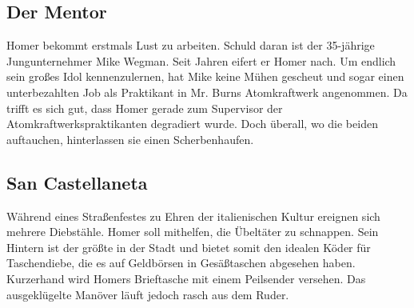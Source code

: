 \subsection{Der Mentor}
Homer bekommt erstmals Lust zu arbeiten. Schuld daran ist der 35-jährige Jungunternehmer Mike Wegman. Seit Jahren eifert er Homer nach. Um endlich sein großes Idol kennenzulernen, hat Mike keine Mühen gescheut und sogar einen unterbezahlten Job als Praktikant in Mr. Burns Atomkraftwerk angenommen. Da trifft es sich gut, dass Homer gerade zum Supervisor der Atomkraftwerkspraktikanten degradiert wurde. Doch überall, wo die beiden auftauchen, hinterlassen sie einen Scherbenhaufen.


\subsection{San Castellaneta}
Während eines Straßenfestes zu Ehren der italienischen Kultur ereignen sich mehrere Diebstähle. Homer soll mithelfen, die Übeltäter zu schnappen. Sein Hintern ist der größte in der Stadt und bietet somit den idealen Köder für Taschendiebe, die es auf Geldbörsen in Gesäßtaschen abgesehen haben. Kurzerhand wird Homers Brieftasche mit einem Peilsender versehen. Das ausgeklügelte Manöver läuft jedoch rasch aus dem Ruder.


